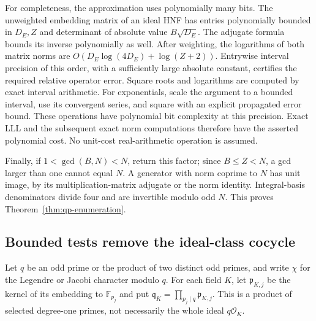 For completeness, the approximation uses polynomially many bits.
The unweighted embedding matrix of an ideal HNF has entries polynomially
bounded in $D_E,Z$ and determinant of absolute value $B\sqrt{D_E}$.
The adjugate formula bounds its inverse polynomially as well.  After
weighting, the logarithms of both matrix norms are
$O(D_E\log(4D_E)+\log(Z+2))$.  Entrywise interval precision of this
order, with a sufficiently large absolute constant, certifies the
required relative operator error.  Square roots and logarithms are
computed by exact interval arithmetic.  For exponentials, scale the
argument to a bounded interval, use its convergent series, and square
with an explicit propagated error bound.  These operations have
polynomial bit complexity at this precision.  Exact LLL and the
subsequent exact norm computations therefore have the asserted
polynomial cost.  No unit-cost real-arithmetic operation is assumed.

Finally, if $1<\gcd(B,N)<N$, return this factor; since $B\leq Z<N$,
a gcd larger than one cannot equal $N$.  A generator with norm coprime
to $N$ has unit image, by its multiplication-matrix adjugate or the norm
identity.  Integral-basis denominators divide four and are invertible
modulo odd $N$.  This proves Theorem~\ref{thm:qp-enumeration}.

\subsection{Bounded tests remove the ideal-class cocycle}
\label{subsec:qp-characters}

Let $q$ be an odd prime or the product of two distinct odd primes, and
write $\chi$ for the Legendre or Jacobi character modulo $q$.
For each field $K$, let $\mathfrak p_{K,j}$ be the kernel of its
embedding to $\mathbb F_{p_j}$ and put
$\mathfrak q_K=\prod_{p_j\mid q}\mathfrak p_{K,j}$.
This is a product of selected degree-one primes, not necessarily the
whole ideal $q\mathcal O_K$.

